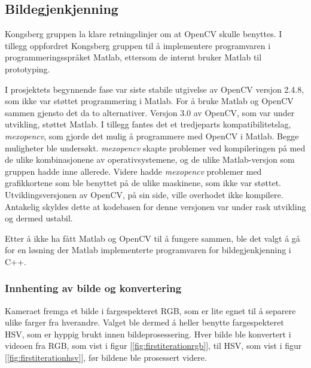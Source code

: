\subsection{Bildegjenkjenning}

Kongsberg gruppen la klare retningslinjer om at OpenCV skulle benyttes. I tillegg oppfordret Kongsberg gruppen til å implementere programvaren i programmeringsspråket Matlab, ettersom de internt bruker Matlab til prototyping. 

I prosjektets begynnende fase var siste stabile utgivelse av OpenCV versjon 2.4.8, som ikke var støttet programmering i Matlab. For å bruke Matlab og OpenCV sammen gjensto det da to alternativer. Versjon 3.0 av OpenCV, som var under utvikling, støttet Matlab. I tillegg fantes det et tredjeparts kompatibilitetslag, \emph{mexopencv}, som gjorde det mulig å programmere med OpenCV i Matlab. Begge muligheter ble undersøkt. \emph{mexopencv} skapte problemer ved kompileringen på med de ulike kombinasjonene av operativsystemene, og de ulike Matlab-versjon som gruppen hadde inne allerede. Videre hadde \emph{mexopencv} problemer med grafikkortene som ble benyttet på de ulike maskinene, som ikke var støttet. Utviklingsversjonen av OpenCV, på sin side, ville overhodet ikke kompilere. Antakelig skyldes dette at kodebasen for denne versjonen var under rask utvikling og dermed ustabil.

Etter å ikke ha fått Matlab og OpenCV til å fungere sammen, ble det valgt å gå for en løsning der Matlab implementerte programvaren for bildegjenkjenning i C++. 
\subsubsection{Innhenting av bilde og konvertering}

Kameraet fremga et bilde i fargespekteret RGB, som er lite egnet til å separere ulike farger fra hverandre. Valget ble dermed å heller benytte fargespekteret HSV, som er hyppig brukt innen bildeprosessering. Hver bilde ble konvertert i videoen fra RGB, som vist i figur [\ref{fig:firstiterationrgb}], til HSV, som vist i figur [\ref{fig:firstiterationhsv}], før bildene ble prosessert videre.

